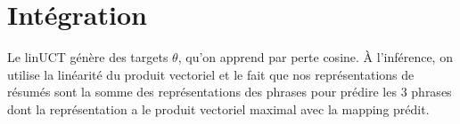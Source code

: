\section{Intégration}

Le linUCT génère des targets $\theta$, qu'on apprend par perte cosine.
À l'inférence, on utilise la linéarité du produit vectoriel
et le fait que nos représentations de résumés sont la somme
des représentations des phrases pour prédire les 3 phrases
dont la représentation a le produit vectoriel maximal avec la mapping
prédit.